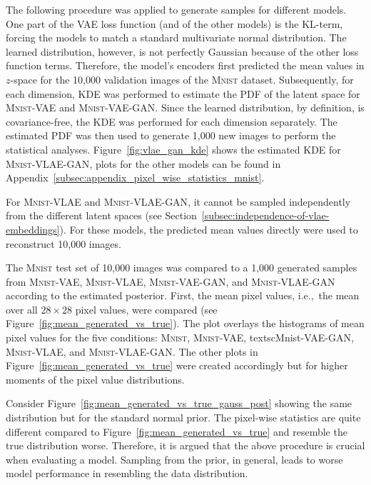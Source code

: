 The following procedure was applied to generate samples for different models.
One part of the \ac{VAE} loss function (and of the other models) is the \ac{KL}-term, forcing the models to match a standard multivariate normal distribution.
The learned distribution, however, is not perfectly Gaussian because of the other loss function terms.
Therefore, the model's encoders first predicted the mean values in $z$-space for the 10,000 validation images of the \textsc{Mnist} dataset.
Subsequently, for each dimension, \ac{KDE} was performed to estimate the \ac{PDF} of the latent space for \textsc{Mnist}-\ac{VAE} and \textsc{Mnist}-\ac{VAE}-\ac{GAN}.
Since the learned distribution, by definition, is covariance-free, the \ac{KDE} was performed for each dimension separately.
The estimated \ac{PDF} was then used to generate 1,000 new images to perform the statistical analyses.
Figure~\ref{fig:vlae_gan_kde} shows the estimated \ac{KDE} for \textsc{Mnist}-\ac{VLAE}-\ac{GAN}, plots for the other models can be found in Appendix~\ref{subsec:appendix_pixel_wise_statistics_mnist}.

For \textsc{Mnist}-\ac{VLAE} and \textsc{Mnist}-\ac{VLAE}-\ac{GAN}, it cannot be sampled independently from the different latent spaces (see Section~\ref{subsec:independence-of-vlae-embeddings}).
For these models, the predicted mean values directly were used to reconstruct 10,000 images.

The \textsc{Mnist} test set of 10,000 images was compared to a 1,000 generated samples from \textsc{Mnist}-\ac{VAE}, \textsc{Mnist}-\ac{VLAE}, \textsc{Mnist}-\ac{VAE}-\ac{GAN}, and \textsc{Mnist}-\ac{VLAE}-\ac{GAN} according to the estimated posterior.
First, the mean pixel values, i.e.,~the mean over all $28\times 28$ pixel values, were compared (see Figure~\ref{fig:mean_generated_vs_true}).
The plot overlays the histograms of mean pixel values for the five conditions: \textsc{Mnist}, \textsc{Mnist}-\ac{VAE}, textsc{Mnist}-\ac{VAE}-\ac{GAN}, \textsc{Mnist}-\ac{VLAE}, and \textsc{Mnist}-\ac{VLAE}-\ac{GAN}.
The other plots in Figure~\ref{fig:mean_generated_vs_true} were created accordingly but for higher moments of the pixel value distributions.

Consider Figure~\ref{fig:mean_generated_vs_true_gauss_post} showing the same distribution but for the standard normal prior.
The pixel-wise statistics are quite different compared to Figure~\ref{fig:mean_generated_vs_true} and resemble the true distribution worse.
Therefore, it is argued that the above procedure is crucial when evaluating a model.
Sampling from the prior, in general, leads to worse model performance in resembling the data distribution.


